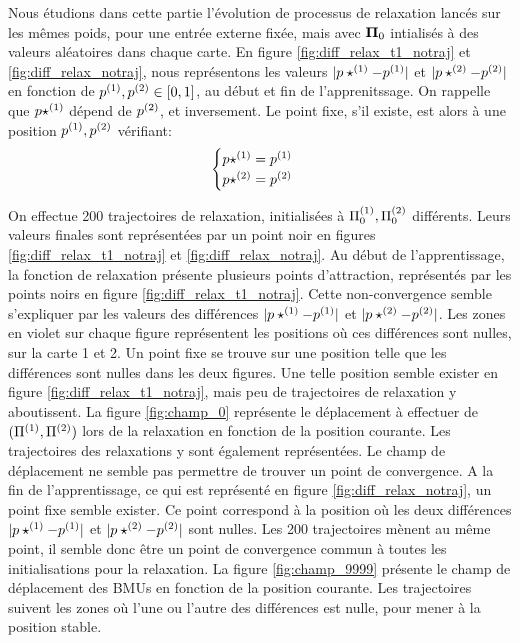 Nous étudions dans cette partie l'évolution de processus de relaxation lancés sur les mêmes poids, pour une entrée externe fixée, mais avec $\mathbf{\Pi}_0$ intialisés à des valeurs aléatoires dans chaque carte.
En figure \ref{fig:diff_relax_t1_notraj} et \ref{fig:diff_relax_notraj}, nous représentons les valeurs $\lvert p\star^{({1})} - p^{({1})} \rvert$ et $\lvert p\star^{({2})} - p^{({2})}\rvert$ en fonction de $p^{({1})},p^{({2})} \in [0,1]$, au début et fin de l'apprenitssage. On rappelle que $p\star^{({1})}$ dépend de $p^{({2})}$, et inversement.
Le point fixe, s'il existe, est alors à une position $p^{({1})},p^{({2})}$ vérifiant:
\begin{equation*}
\begin{cases}
p\star^{({1})} = p^{({1})}\\
p\star^{({2})} = p^{({2})}\\
\end{cases}
\end{equation*}

On effectue 200 trajectoires de relaxation, initialisées à $\Pi^{({1})}_0,\Pi^{({2})}_0$ différents. Leurs valeurs finales sont représentées par un point noir en figures \ref{fig:diff_relax_t1_notraj} et \ref{fig:diff_relax_notraj}. 
Au début de l'apprentissage, la fonction de relaxation présente plusieurs points d'attraction, représentés par les points noirs en figure \ref{fig:diff_relax_t1_notraj}. Cette non-convergence semble s'expliquer par les valeurs des différences $\lvert p\star^{({1})} - p^{({1})} \rvert$ et $\lvert p\star^{({2})} - p^{({2})}\rvert$. Les zones en violet sur chaque figure représentent les positions où ces différences sont nulles, sur la carte 1 et 2. Un point fixe se trouve sur une position telle que les différences sont nulles dans les deux figures. Une telle position semble exister en figure \ref{fig:diff_relax_t1_notraj}, mais peu de trajectoires de relaxation y aboutissent. La figure \ref{fig:champ_0} représente le déplacement à effectuer de $(\Pi^{({1})},\Pi^{({2})})$ lors de la relaxation en fonction de la position courante. Les trajectoires des relaxations y sont également représentées. Le champ de déplacement ne semble pas permettre de trouver un point de convergence.
A la fin de l'apprentissage, ce qui est représenté en figure \ref{fig:diff_relax_notraj}, un point fixe semble exister. Ce point correspond à la position où les deux différences $\lvert p\star^{({1})} - p^{({1})} \rvert$ et $\lvert p\star^{({2})} - p^{({2})}\rvert$ sont nulles. Les 200 trajectoires mènent au même point, il semble donc être un point de convergence commun à toutes les initialisations pour la relaxation. La figure \ref{fig:champ_9999} présente le champ de déplacement des BMUs en fonction de la position courante. Les trajectoires suivent les zones où l'une ou l'autre des différences est nulle, pour mener à la position stable. 

